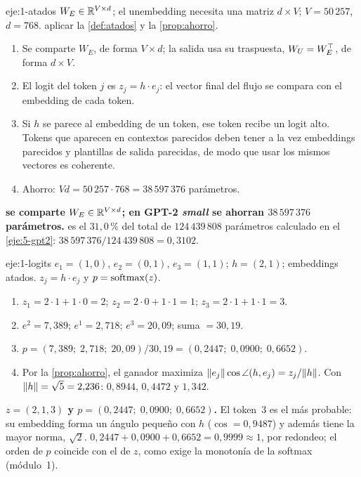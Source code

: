 \begin{solucion}{eje:1-atados}
\datos $W_E\in\mathbb{R}^{V\times d}$; el unembedding necesita una matriz $d\times V$; $V=50\,257$, $d=768$.
\planteamiento aplicar la \cref{def:atados} y la \cref{prop:ahorro}.
\pasos
\begin{enumerate}[label=\arabic*.]
  \item Se comparte $W_E$, de forma $V\times d$; la salida usa su traspuesta, $W_U=W_E^{\top}$, de forma $d\times V$.
  \item El logit del token $j$ es $z_j=h\cdot e_j$: el vector final del flujo se compara con el embedding de cada token.
  \item Si $h$ se parece al embedding de un token, ese token recibe un logit alto. Tokens que aparecen en contextos parecidos deben tener a la vez embeddings parecidos y plantillas de salida parecidas, de modo que usar los mismos vectores es coherente.
  \item Ahorro: $Vd=50\,257\cdot 768=38\,597\,376$ parámetros.
\end{enumerate}
\resultado \textbf{se comparte $W_E\in\mathbb{R}^{V\times d}$; en GPT-2 \emph{small} se ahorran $38\,597\,376$ parámetros.}
\comprobacion es el $31{,}0\,\%$ del total de $124\,439\,808$ parámetros calculado en el \cref{eje:5-gpt2}: $38\,597\,376/124\,439\,808=0{,}3102$.
\end{solucion}

\begin{solucion}{eje:1-logits}
\datos $e_1=(1,0)$, $e_2=(0,1)$, $e_3=(1,1)$; $h=(2,1)$; embeddings atados.
\planteamiento $z_j=h\cdot e_j$ y $p=\operatorname{softmax}(z)$.
\pasos
\begin{enumerate}[label=\arabic*.]
  \item $z_1=2\cdot 1+1\cdot 0=2$; $z_2=2\cdot 0+1\cdot 1=1$; $z_3=2\cdot 1+1\cdot 1=3$.
  \item $e^{2}=7{,}389$; $e^{1}=2{,}718$; $e^{3}=20{,}09$; suma $=30{,}19$.
  \item $p=(7{,}389;\;2{,}718;\;20{,}09)/30{,}19=(0{,}2447;\;0{,}0900;\;0{,}6652)$.
  \item Por la \cref{prop:ahorro}, el ganador maximiza $\lVert e_j\rVert\cos\angle(h,e_j)=z_j/\lVert h\rVert$. Con $\lVert h\rVert=\sqrt5=2{,}236$: $0{,}8944$, $0{,}4472$ y $1{,}342$.
\end{enumerate}
\resultado \textbf{$z=(2,1,3)$ y $p=(0{,}2447;\;0{,}0900;\;0{,}6652)$.} El token~3 es el más probable: su embedding forma un ángulo pequeño con $h$ ($\cos=0{,}9487$) y además tiene la mayor norma, $\sqrt2$.
\comprobacion $0{,}2447+0{,}0900+0{,}6652=0{,}9999\approx 1$, por redondeo; el orden de $p$ coincide con el de $z$, como exige la monotonía de la softmax (módulo~1).
\end{solucion}

